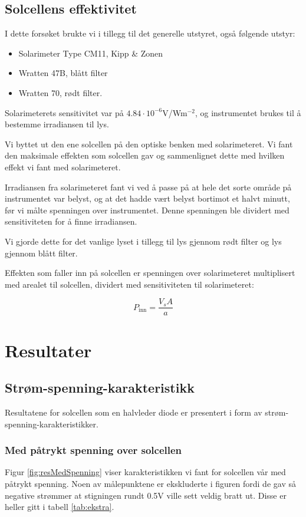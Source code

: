 \documentclass[a4paper,11pt, twocolumn]{article}
\begin{document}
\subsection{Solcellens effektivitet}
I dette forsøket brukte vi i tillegg til det generelle utstyret, også følgende utstyr:

\begin{itemize}
	\item Solarimeter Type CM11, Kipp \& Zonen
	\item Wratten 47B, blått filter
	\item Wratten 70, rødt filter.
\end{itemize}
Solarimeterets sensitivitet var på $4.84\cdot10^{-6}$V/Wm$^{-2}$, og instrumentet brukes til å bestemme irradiansen til lys.

Vi byttet ut den ene solcellen på den optiske benken med solarimeteret. Vi fant den maksimale effekten som solcellen gav og sammenlignet dette med hvilken effekt vi fant med solarimeteret. 

Irradiansen fra solarimeteret fant vi ved å passe på at hele det sorte område på instrumentet var belyst, og at det hadde vært belyst bortimot et halvt minutt, før vi målte spenningen over instrumentet. Denne spenningen ble dividert med sensitiviteten for å finne irradiansen.

Vi gjorde dette for det vanlige lyset i tillegg til lys gjennom rødt filter og lys gjennom blått filter.

Effekten som faller inn på solcellen er spenningen over solarimeteret multiplisert med arealet til solcellen, dividert med sensitiviteten til solarimeteret:

\begin{equation}
	P_\text{inn} = \frac{V_sA}{a}
\end{equation}

\section{Resultater}
\subsection{Strøm-spenning-karakteristikk}
Resultatene for solcellen som en halvleder diode er presentert i form av strøm-spenning-karakteristikker.
\subsubsection{Med påtrykt spenning over solcellen}
Figur \ref{fig:resMedSpenning} viser karakteristikken vi fant for solcellen vår med påtrykt spenning. Noen av målepunktene er ekskluderte i figuren fordi de gav så negative strømmer at stigningen rundt 0.5V ville sett veldig bratt ut. Disse er heller gitt i tabell \ref{tab:ekstra}.
\end{document}

